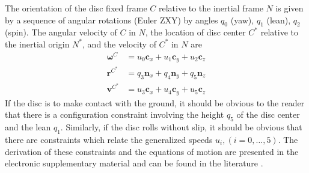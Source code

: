 \documentclass[smallcondensed]{svjour3}                     %
\begin{document}
The orientation of the disc fixed frame $C$ relative to the inertial frame $N$
is given by a sequence of angular rotations (Euler ZXY) by angles $q_0$ (yaw),
$q_1$ (lean), $q_2$ (spin).  The angular velocity of $C$ in $N$, the location
of disc center $C^*$ relative to the inertial origin $N^*$, and the velocity of
$C^*$ in $N$ are
\begin{align}
  \bm{\omega}^C &= u_0 \bm{c}_x + u_1 \bm{c}_y + u_2 \bm{c}_z \\
  \bm{r}^{C^*} &= q_3 \bm{n}_x + q_4 \bm{n}_y + q_5 \bm{n}_z \\
  \bm{v}^{C^*} &= u_3 \bm{c}_x + u_4 \bm{c}_y + u_5 \bm{c}_z
\end{align}
If the disc is to make contact with the ground, it should be obvious to the
reader that there is a configuration constraint involving the height $q_5$ of
the disc center and the lean $q_1$.  Similarly, if the disc rolls without
slip, it should be obvious that there are constraints which relate the
generalized speeds $u_i, (i = 0,\dots,5)$.  The derivation of these
constraints and the equations of motion are presented in the electronic
supplementary material and can be found in the literature \cite{O'Reilly1996}.
\end{document}
